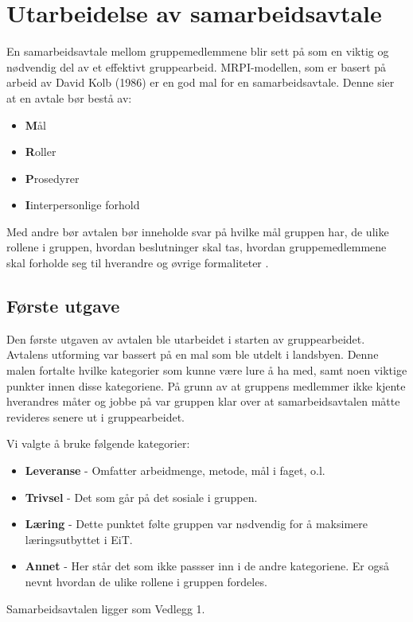 \section{Utarbeidelse av samarbeidsavtale}
En samarbeidsavtale mellom gruppemedlemmene blir sett på som en viktig og nødvendig del av et effektivt gruppearbeid. 
MRPI-modellen, som er basert på arbeid av David Kolb (1986) er en god mal for en samarbeidsavtale. 
Denne sier at en avtale bør bestå av:
\begin{itemize}
  \item \textbf{M}ål
  \item \textbf{R}oller
  \item \textbf{P}rosedyrer
  \item \textbf{I}interpersonlige forhold
\end{itemize}
Med andre bør avtalen bør inneholde svar på hvilke mål gruppen har, de ulike rollene i gruppen, hvordan beslutninger skal tas, hvordan gruppemedlemmene skal forholde seg til hverandre og øvrige formaliteter \citep{levin}.

\subsection{Første utgave}
Den første utgaven av avtalen ble utarbeidet i starten av gruppearbeidet. 
Avtalens utforming var bassert på en mal som ble utdelt i landsbyen. 
Denne malen fortalte hvilke kategorier som kunne være lure å ha med, samt noen viktige punkter innen disse kategoriene. 
På grunn av at gruppens medlemmer ikke kjente hverandres måter og jobbe på var gruppen klar over at samarbeidsavtalen måtte revideres senere ut i gruppearbeidet. 
\vspace{\secspace}

Vi valgte å bruke følgende kategorier:
\begin{itemize}
    \item \textbf{Leveranse} - Omfatter arbeidmenge, metode, mål i faget, o.l.
    \item \textbf{Trivsel} - Det som går på det sosiale i gruppen. 
    \item \textbf{Læring} - Dette punktet følte gruppen var nødvendig for å maksimere læringsutbyttet i EiT. 
    \item \textbf{Annet} - Her står det som ikke passser inn i de andre kategoriene. Er også nevnt hvordan de ulike rollene i gruppen fordeles. 
\end{itemize}
Samarbeidsavtalen ligger som Vedlegg 1. 

